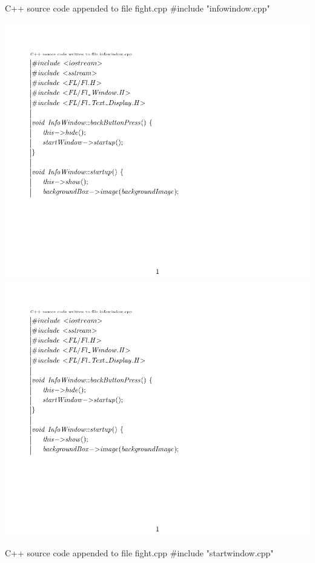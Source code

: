 \documentclass{article}
\begin{document}
\begin{GFT}{C++ source code appended to file fight.cpp}
\+\#include "infowindow.cpp"\\
\end{GFT}
\includegraphics[page=1]{infowindow.pdf}
\includegraphics[page=2]{infowindow.pdf}
\begin{GFT}{C++ source code appended to file fight.cpp}
\+\#include "startwindow.cpp"\\
\end{GFT}
\end{document}
